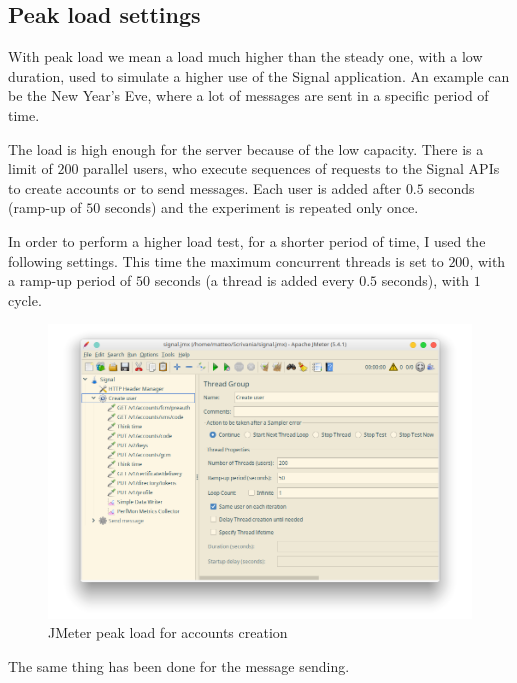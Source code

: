 \subsection{Peak load settings\label{sec:highloadsettings}}

With peak load we mean a load much higher than the steady one, with a low duration, used to simulate a higher use of the Signal application. An example can be the New Year's Eve, where a lot of messages are sent in a specific period of time.

The load is high enough for the server because of the low capacity.
There is a limit of $200$ parallel users, who execute sequences of requests to the Signal APIs to create accounts or to send messages. Each user is added after $0.5$ seconds (ramp-up of $50$ seconds) and the experiment is repeated only once.

In order to perform a higher load test, for a shorter period of time, I used the following settings.
This time the maximum concurrent threads is set to $200$, with a ramp-up period of $50$ seconds (a thread is added every $0.5$ seconds), with $1$ cycle.

\begin{figure}[H]
    \centering
    \includegraphics[width=\textwidth]{images/jmeter-peak-create}
    \caption{JMeter peak load for accounts creation}
    \label{fig:jmeterhighloadcreate}
\end{figure}

\clearpage

The same thing has been done for the message sending.

